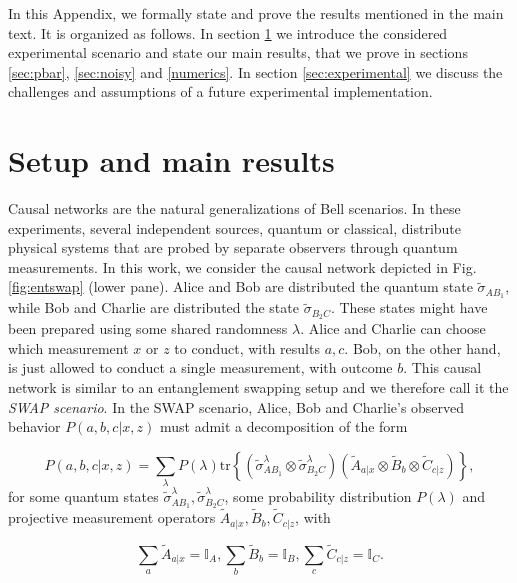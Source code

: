 \documentclass[onecolumn,prx,amsmath,amssymb]{revtex4-2}
\def\be{\begin{equation}}
\def\ee{\end{equation}}
\def\id{{\mathbb I}}
\def\tr{\mbox{tr}}
\begin{document}
\begin{appendix}

In this Appendix, we formally state and prove the results mentioned in the main text. It is organized as follows. In section \ref{sec:setup} we introduce the considered experimental scenario and state our main results, that we prove in sections \ref{sec:pbar}, \ref{sec:noisy} and \ref{numerics}. In section \ref{sec:experimental} we discuss the challenges and assumptions of a future experimental implementation.

\section{Setup and main results} \label{sec:setup}

Causal networks are the natural generalizations of Bell scenarios. In these experiments, several independent sources, quantum or classical, distribute physical systems that are probed by separate observers through quantum measurements. In this work, we consider the causal network depicted in Fig. \ref{fig:entswap} (lower pane). Alice and Bob are distributed the quantum state $\tilde{\sigma}_{AB_1}$, while Bob and Charlie are distributed the state $\tilde{\sigma}_{B_2C}$. These states might have been prepared using some shared randomness $\lambda$. Alice and Charlie can choose which measurement $x$ or $z$ to conduct, with results $a, c$. Bob, on the other hand, is just allowed to conduct a single measurement, with outcome $b$. This causal network is similar to an entanglement swapping setup and we therefore call it the \emph{SWAP scenario}. In the SWAP scenario, Alice, Bob and Charlie's observed behavior $P(a,b,c|x,z)$ must admit a decomposition of the form

\be
P(a,b,c|x,z)=\sum_\lambda P(\lambda)\tr\left\{(\tilde{\sigma}^{\lambda}_{AB_1}\otimes\tilde{\sigma}^{\lambda}_{B_2C})(\tilde{A}_{a|x}\otimes \tilde{B}_{b}\otimes \tilde{C}_{c|z})\right\},
\label{decomp}
\ee
\noindent for some quantum states $\tilde{\sigma}_{AB_1}^\lambda,\tilde{\sigma}_{B_2C}^\lambda$, some probability distribution $P(\lambda)$ and projective measurement operators $\tilde{A}_{a|x},\tilde{B}_{b},\tilde{C}_{c|z}$, with 

\be
\sum_{a}\tilde{A}_{a|x}=\id_A, \sum_b \tilde{B}_b=\id_B, \sum_c \tilde{C}_{c|z}=\id_C.
\ee


\end{appendix}
\end{document}
